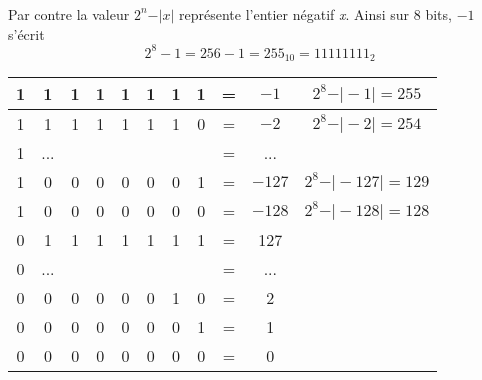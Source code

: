 \documentclass[svgnames,11pt]{beamer}
\begin{document}
\begin{frame}
    \frametitle{}

    Par contre la valeur $2^n - \vert x\vert$ représente l'entier négatif \emph{x}. Ainsi sur 8 bits, $-1$ s'écrit $$2^8-1 = 256 - 1 = 255_{10} = 11111111_2$$
    \begin{center}
        \begin{tabular}{|cccccccccc|c|}
            \hline
            1 & 1   & 1 & 1 & 1 & 1 & 1 & 1 & = & $-1$   & $2^8 - \vert -1\vert = 255$   \\
            \hline
            1 & 1   & 1 & 1 & 1 & 1 & 1 & 0 & = & $-2$   & $2^8 - \vert -2\vert = 254$   \\
            \hline
            1 & ... &   &   &   &   &   &   & = & ...    &                               \\
            \hline
            1 & 0   & 0 & 0 & 0 & 0 & 0 & 1 & = & $-127$ & $2^8 - \vert -127\vert = 129$ \\
            \hline
            1 & 0   & 0 & 0 & 0 & 0 & 0 & 0 & = & $-128$ & $2^8 - \vert -128\vert=128$   \\
            \hline
            0 & 1   & 1 & 1 & 1 & 1 & 1 & 1 & = & 127    &                               \\
            \hline
            0 & ... &   &   &   &   &   &   & = & ...    &                               \\
            \hline
            0 & 0   & 0 & 0 & 0 & 0 & 1 & 0 & = & 2      &                               \\
            \hline
            0 & 0   & 0 & 0 & 0 & 0 & 0 & 1 & = & 1      &                               \\
            \hline
            0 & 0   & 0 & 0 & 0 & 0 & 0 & 0 & = & 0      &                               \\
            \hline
        \end{tabular}
    \end{center}

\end{frame}
\end{document}
